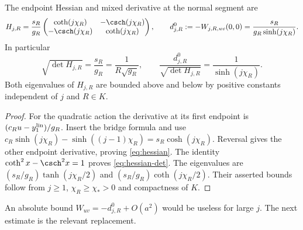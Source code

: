 \begin{lemma}\label{lem:hessian}
The endpoint Hessian and mixed derivative at the normal segment are
\begin{equation}\label{eq:hessian}
 H_{j,R}=\frac{s_R}{g_R}
 \begin{pmatrix}\coth(j\chi_R)&-\csch(j\chi_R)\\
                -\csch(j\chi_R)&\coth(j\chi_R)\end{pmatrix},
 \qquad
 d^0_{j,R}:=-W_{j,R,uv}(0,0)=\frac{s_R}{g_R\sinh(j\chi_R)}.
\end{equation}
In particular
\begin{equation}\label{eq:hessian-det}
 \sqrt{\det H_{j,R}}=\frac{s_R}{g_R}=\frac1{R\sqrt{g_R}},
 \qquad
 \frac{d^0_{j,R}}{\sqrt{\det H_{j,R}}}=\frac1{\sinh(j\chi_R)}.
\end{equation}
Both eigenvalues of $H_{j,R}$ are bounded above and below by positive
constants independent of $j$ and $R\in K$.
\end{lemma}
\begin{proof}
For the quadratic action the derivative at its first endpoint is
$(c_Ru-y_1^{\rm lin})/g_R$. Insert the bridge formula and use
$c_R\sinh(j\chi_R)-\sinh((j-1)\chi_R)
=s_R\cosh(j\chi_R)$. Reversal gives the other endpoint derivative,
proving \eqref{eq:hessian}. The identity
$\coth^2x-\csch^2x=1$ proves \eqref{eq:hessian-det}.
The eigenvalues are
$(s_R/g_R)\tanh(j\chi_R/2)$ and
$(s_R/g_R)\coth(j\chi_R/2)$. Their asserted bounds follow from
$j\ge1$, $\chi_R\ge\chi_*>0$ and compactness of $K$.
\end{proof}

An absolute bound $W_{uv}=-d^0_{j,R}+O(a^2)$ would be useless for large
$j$. The next estimate is the relevant replacement.


